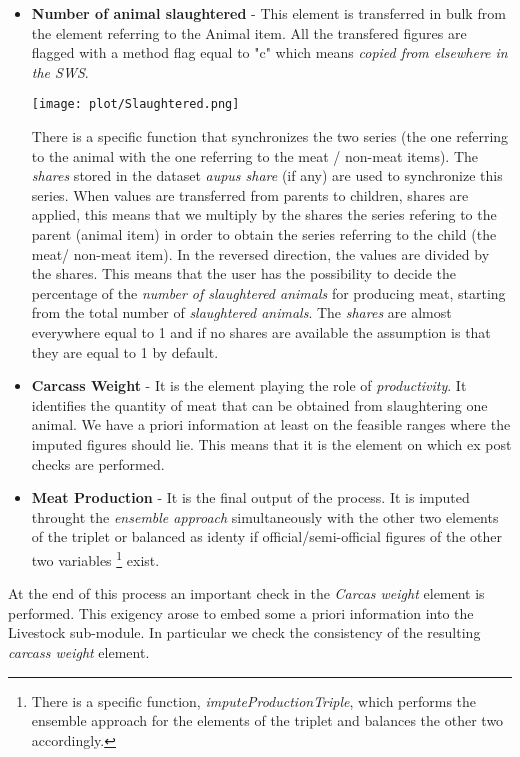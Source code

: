 \documentclass[nojss]{jss}
\begin{document}
\begin{itemize}
\item{\textbf{Number of animal slaughtered} - This element is transferred in bulk from the element referring to the Animal item. All the transfered figures are flagged with a method flag equal to "c" which means \textit{copied from elsewhere in the SWS}.

\begin{center}
\texttt{[image: plot/Slaughtered.png]}
\end{center}

There is a specific function that synchronizes the two series (the one referring to the
animal with the one referring to the meat / non-meat items). The \textit{shares} stored in the dataset \textit{aupus share} (if any) are used to synchronize this series. When values are transferred from parents to children, shares are applied, this means that we multiply by the shares the series refering to the parent (animal item) in order to obtain the series referring to the child (the meat/ non-meat item). In the reversed direction, the values are divided by the shares. This means that the user has the possibility to decide the percentage of the \textit{number of slaughtered animals} for producing meat,  starting from the total number of \textit{slaughtered animals}. The \textit{shares} are almost everywhere equal to 1 and if no shares are available the assumption is that they
are equal to 1 by default.
}
\item{\textbf{Carcass Weight} - It is the element playing the role of \textit{productivity}. It identifies the quantity of meat that can be obtained from slaughtering one animal. We have a priori information at least on the feasible ranges where the imputed figures should lie. This means that it is the element on which ex post checks are performed.}
\item{\textbf{Meat Production} - It is the final output of the process. It is imputed throught the \textit{ensemble approach} simultaneously with the other two elements of the triplet or balanced as identy if official/semi-official figures of the other two variables \footnote{There is a specific function, \textit{imputeProductionTriple}, which performs the ensemble approach for the elements of the triplet and balances the other two accordingly.} exist.}
\end{itemize}

At the end of this process an important check in the \textit{Carcas weight} element is performed. This exigency arose to embed some a priori information into the Livestock sub-module. In particular we check the consistency of the resulting \textit{carcass weight} element.
\end{document}
